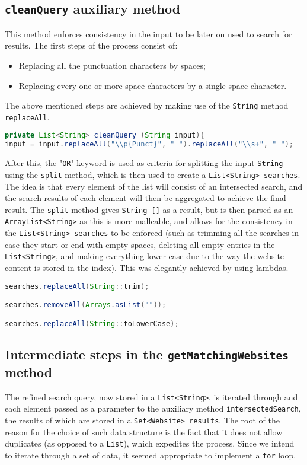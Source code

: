 \subsection{{\tt cleanQuery} auxiliary method}
This method enforces consistency in the input to be later on used to search for results. The first steps of the process consist of:
\begin{itemize}
    \item Replacing all the punctuation characters by spaces;
    \item Replacing every one or more space characters by a single space character.
\end{itemize}
The above mentioned steps are achieved by making use of the {\tt String} method {\tt replaceAll}.
\begin{lstlisting}[language=Java]
private List<String> cleanQuery (String input){
input = input.replaceAll("\\p{Punct}", " ").replaceAll("\\s+", " ");
\end{lstlisting}
After this, the "{\tt OR}" keyword is used as criteria for splitting the input {\tt String} using the {\tt split} method, which is then used to create a {\tt List<String> searches}. The idea is that every element of the list will consist of an intersected search, and the search results of each element will then be aggregated to achieve the final result.
The {\tt split} method gives {\tt String []} as a result, but is then parsed as an {\tt ArrayList<String>} as this is more malleable, and allows for the consistency in the {\tt List<String> searches} to be enforced (such as trimming all the searches in case they start or end with empty spaces, deleting all empty entries in the {\tt List<String>}, and making everything lower case due to the way the website content is stored in the index). This was elegantly achieved by using lambdas.
\begin{lstlisting}[language=Java]
searches.replaceAll(String::trim);

searches.removeAll(Arrays.asList(""));

searches.replaceAll(String::toLowerCase);
\end{lstlisting}

\subsection{Intermediate steps in the {\tt getMatchingWebsites} method}
The refined search query, now stored in a {\tt List<String>}, is iterated through and each element passed as a parameter to the auxiliary method {\tt intersectedSearch}, the results of which are stored in a {\tt Set<Website> results}. The root of the reason for the choice of such data structure is the fact that it does not allow duplicates (as opposed to a {\tt List}), which expedites the process. Since we intend to iterate through a set of data, it seemed appropriate to implement a {\tt for} loop.

